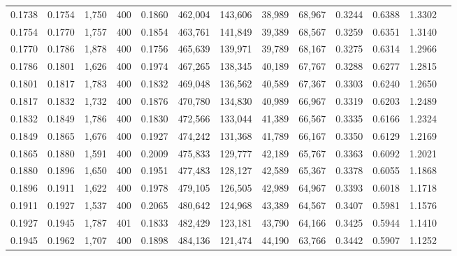 \begin{tabular}{rrrrrrrrrrrrr}
0.1738 & 0.1754 &  1,750 &   400 &                                     0.1860 & 462,004 & 143,606 &  38,989 &  68,967 & 0.3244 & 0.6388 & 1.3302 \\
0.1754 & 0.1770 &  1,757 &   400 &                                     0.1854 & 463,761 & 141,849 &  39,389 &  68,567 & 0.3259 & 0.6351 & 1.3140 \\
0.1770 & 0.1786 &  1,878 &   400 &                                     0.1756 & 465,639 & 139,971 &  39,789 &  68,167 & 0.3275 & 0.6314 & 1.2966 \\
0.1786 & 0.1801 &  1,626 &   400 &                                     0.1974 & 467,265 & 138,345 &  40,189 &  67,767 & 0.3288 & 0.6277 & 1.2815 \\
0.1801 & 0.1817 &  1,783 &   400 &                                     0.1832 & 469,048 & 136,562 &  40,589 &  67,367 & 0.3303 & 0.6240 & 1.2650 \\
0.1817 & 0.1832 &  1,732 &   400 &                                     0.1876 & 470,780 & 134,830 &  40,989 &  66,967 & 0.3319 & 0.6203 & 1.2489 \\
0.1832 & 0.1849 &  1,786 &   400 &                                     0.1830 & 472,566 & 133,044 &  41,389 &  66,567 & 0.3335 & 0.6166 & 1.2324 \\
0.1849 & 0.1865 &  1,676 &   400 &                                     0.1927 & 474,242 & 131,368 &  41,789 &  66,167 & 0.3350 & 0.6129 & 1.2169 \\
0.1865 & 0.1880 &  1,591 &   400 &                                     0.2009 & 475,833 & 129,777 &  42,189 &  65,767 & 0.3363 & 0.6092 & 1.2021 \\
0.1880 & 0.1896 &  1,650 &   400 &                                     0.1951 & 477,483 & 128,127 &  42,589 &  65,367 & 0.3378 & 0.6055 & 1.1868 \\
0.1896 & 0.1911 &  1,622 &   400 &                                     0.1978 & 479,105 & 126,505 &  42,989 &  64,967 & 0.3393 & 0.6018 & 1.1718 \\
0.1911 & 0.1927 &  1,537 &   400 &                                     0.2065 & 480,642 & 124,968 &  43,389 &  64,567 & 0.3407 & 0.5981 & 1.1576 \\
0.1927 & 0.1945 &  1,787 &   401 &                                     0.1833 & 482,429 & 123,181 &  43,790 &  64,166 & 0.3425 & 0.5944 & 1.1410 \\
0.1945 & 0.1962 &  1,707 &   400 &                                     0.1898 & 484,136 & 121,474 &  44,190 &  63,766 & 0.3442 & 0.5907 & 1.1252 \\

\end{tabular}
